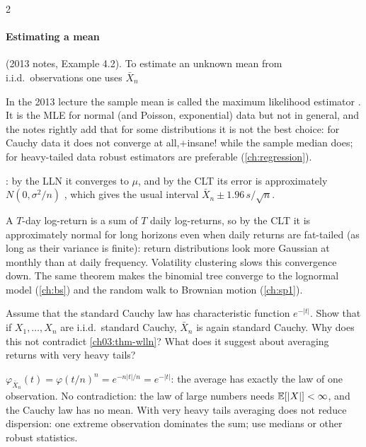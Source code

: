 \begin{paracol}{2}
\paragraph{Estimating a mean} (2013 notes, Example 4.2). To estimate an unknown mean from i.i.d.\ observations one uses
$\bar X_n$ \begin{coursenote}
In the 2013 lecture the sample mean is called the maximum likelihood estimator . It is the MLE
for normal (and Poisson, exponential) data but not in general, and the notes rightly add that for some
distributions it is not the best choice: for Cauchy data it does not converge at all,\note+{insane!} while the sample
median does; for heavy-tailed data robust estimators are preferable (\cref{ch:regression}).
\end{coursenote}: by the LLN it converges to $\mu$, and by
the CLT its error is approximately $N(0,\sigma^2/n)$ ,
which gives the usual interval $\bar X_n\pm1.96\,s/\sqrt n$.

\begin{finance}
A $T$-day log-return is a sum of $T$ daily log-returns, so by the CLT it is approximately normal for long
horizons even when daily returns are fat-tailed (as long as their variance is finite): return distributions
look more Gaussian at monthly than at daily frequency. Volatility clustering slows this convergence down. The
same theorem makes the binomial tree converge to the lognormal model (\cref{ch:bs}) and the random walk to
Brownian motion (\cref{ch:sp1}).
\end{finance}

\begin{exercise}\label{ch03:ex-cauchy}
Assume that the standard Cauchy law has characteristic function $e^{-|t|}$. Show that if $X_1,\dots,X_n$ are i.i.d.\
standard Cauchy, $\bar X_n$ is again standard Cauchy. Why does this not contradict \cref{ch03:thm-wlln}? What does it
suggest about averaging returns with very heavy tails?
\end{exercise}
\begin{solution}[ch03:ex-cauchy]
$\varphi_{\bar X_n}(t)=\varphi(t/n)^n=e^{-n|t|/n}=e^{-|t|}$: the average has exactly the law of one observation. No contradiction:
the law of large numbers needs $\mathbb{E}[|X|]<\infty$, and the Cauchy law has no mean. With very heavy tails averaging
does not reduce dispersion: one extreme observation dominates the sum; use medians or other robust statistics.
\end{solution}


\end{paracol}
